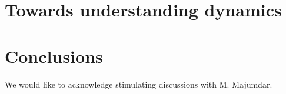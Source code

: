 \documentclass[aps,showpacs,twocolumn,floatfix,prx,superscriptaddress]{revtex4-1}
\begin{document}
\section{Towards understanding dynamics}

\section{Conclusions}

\begin{acknowledgments}
We would like to acknowledge stimulating discussions with M. Majumdar.\end{acknowledgments}


\end{document}
